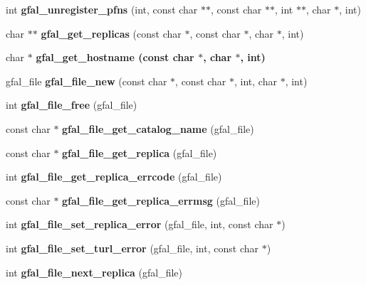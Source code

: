 \begin{CompactItemize}
\item 
int \textbf{gfal\_\-unregister\_\-pfns} (int, const char $\ast$$\ast$, const char $\ast$$\ast$, int $\ast$$\ast$, char $\ast$, int)\label{group__internal__group_g70f889fa2436723fb7b3cff20b661f21}

\item 
char $\ast$$\ast$ \textbf{gfal\_\-get\_\-replicas} (const char $\ast$, const char $\ast$, char $\ast$, int)\label{group__internal__group_gbd0a581309f65e07a5e28d442f07b169}

\item 
char $\ast$ \bf{gfal\_\-get\_\-hostname} (const char $\ast$, char $\ast$, int)
\item 
gfal\_\-file \textbf{gfal\_\-file\_\-new} (const char $\ast$, const char $\ast$, int, char $\ast$, int)\label{group__internal__group_g4c083c77e3b95b63f7a66d9cad7d24b4}

\item 
int \textbf{gfal\_\-file\_\-free} (gfal\_\-file)\label{group__internal__group_g564d0244067d6e1d424cea5ec1336be6}

\item 
const char $\ast$ \textbf{gfal\_\-file\_\-get\_\-catalog\_\-name} (gfal\_\-file)\label{group__internal__group_g8e5135cef19dfa4106dc8a6da1b78721}

\item 
const char $\ast$ \textbf{gfal\_\-file\_\-get\_\-replica} (gfal\_\-file)\label{group__internal__group_ga3feb45524d1a8e8cccd33249ee3ccb7}

\item 
int \textbf{gfal\_\-file\_\-get\_\-replica\_\-errcode} (gfal\_\-file)\label{group__internal__group_g19b575e12fff918eda15bf9933705f9a}

\item 
const char $\ast$ \textbf{gfal\_\-file\_\-get\_\-replica\_\-errmsg} (gfal\_\-file)\label{group__internal__group_ga8418371e63e1c3ee5da57b0b75a0a32}

\item 
int \textbf{gfal\_\-file\_\-set\_\-replica\_\-error} (gfal\_\-file, int, const char $\ast$)\label{group__internal__group_g5de1931dff2c84de9db70f88cfe85662}

\item 
int \textbf{gfal\_\-file\_\-set\_\-turl\_\-error} (gfal\_\-file, int, const char $\ast$)\label{group__internal__group_gafd5eb622406793e29b3aaf4d82ca399}

\item 
int \textbf{gfal\_\-file\_\-next\_\-replica} (gfal\_\-file)\label{group__internal__group_g6de434f3dc9aef814ca6d67c40febbbe}


\end{CompactItemize}
